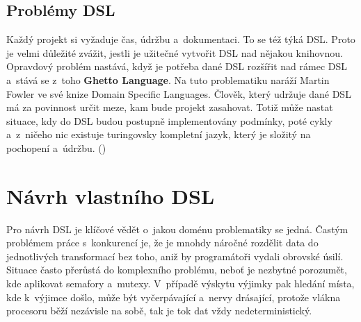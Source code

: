 \documentclass[male, czech]{kithesis}
\begin{document}
{\begin{center}
\end{center}
}

\section{Problémy DSL}

Každý projekt si vyžaduje čas, údržbu a~dokumentaci.
To se též týká DSL.
Proto je velmi důležité zvážit, 
jestli je užitečné vytvořit DSL nad nějakou knihovnou.
Opravdový problém nastává, 
když je potřeba dané DSL rozšířit nad rámec DSL
a~stává se z~toho \textbf{Ghetto Language}.
Na tuto problematiku naráží Martin Fowler ve své knize Domain Specific Languages.
Člověk,
který udržuje dané DSL má za povinnost určit meze,
kam bude projekt zasahovat. 
Totiž může nastat situace,
kdy do DSL budou postupně implementovány podmínky,
poté cykly
a~z~ničeho nic existuje turingovsky kompletní jazyk, 
který je složitý na pochopení a~údržbu. (\cite[s.38-39]{Fowlerc2011})


\chapter{Návrh vlastního DSL}

Pro návrh DSL je klíčové vědět o~jakou doménu problematiky se jedná.
Častým problémem práce s~konkurencí je, 
že je mnohdy náročné rozdělit data do jednotlivých transformací bez toho, 
aniž by programátoři vydali obrovské úsilí.
Situace často přerůstá do komplexního problému, 
neboť je nezbytné porozumět, 
kde aplikovat semafory a~mutexy. 
V~případě výskytu výjimky pak hledání místa, 
kde k~výjimce došlo, 
může být vyčerpávající a~nervy drásající,
protože vlákna procesoru běží nezávisle na sobě,
tak je tok dat vždy nedeterministický.
\end{document}
